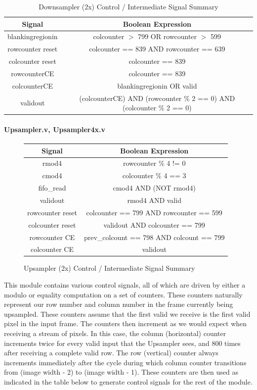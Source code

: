 \begin{table}
    \tiny
\noindent \begin{tabular}{ c | c } \toprule
Signal & Boolean Expression \\\toprule
blankingregionin & colcounter $>$ 799 OR rowcounter $>$ 599 \\
rowcounter reset & colcounter == 839 AND rowcounter == 639 \\
colcounter reset & colcounter == 839 \\
rowcounterCE & colcounter == 839 \\
colcounterCE & blankingregionin OR valid \\
validout & (colcounterCE) AND (rowcounter \% 2 == 0) AND (colcounter \% 2 == 0) \\
\end{tabular}
\caption{ Downsampler (2x) Control / Intermediate Signal Summary } \label{wrap-tab:downsample}
\end{table}

\paragraph{Upsampler.v, Upsampler4x.v}

\begin{figure}
    \centering
\tiny
\noindent \begin{tabular}{ c | c } \toprule
Signal & Boolean Expression \\\toprule
rmod4 & rowcounter \% 4 != 0 \\
cmod4 & colcounter \% 4 == 3 \\
fifo\_read & cmod4 AND (NOT rmod4) \\
validout & rmod4 AND valid \\
rowcounter reset & colcounter == 799 AND rowcounter == 599 \\
colcounter reset & validout AND colcounter == 799 \\
rowcounter CE & prev\_colcount == 798 AND colcount == 799 \\
colcounter CE & validout \\
\end{tabular}
\caption{ Upsampler (2x) Control / Intermediate Signal Summary } \label{fig:upsamplersignals}
\end{figure}

This module contains various control signals, all of which are driven by either
a modulo or equality computation on a set of counters. These counters naturally
represent our row number and column number in the frame currently being upsampled. 
These counters assume that the first valid we receive is the first valid pixel in the 
input frame. The counters then increment as we would expect when receiving a stream
of pixels. In this case, the column (horizontal) counter increments twice for
every valid input that the Upsampler sees, and 800 times after receiving a complete
valid row. The row (vertical) counter always increments immediately after the
cycle during which column counter transitions from (image width - 2) to (image width - 1).
These counters are then used as indicated in the table below to generate control
signals for the rest of the module.


